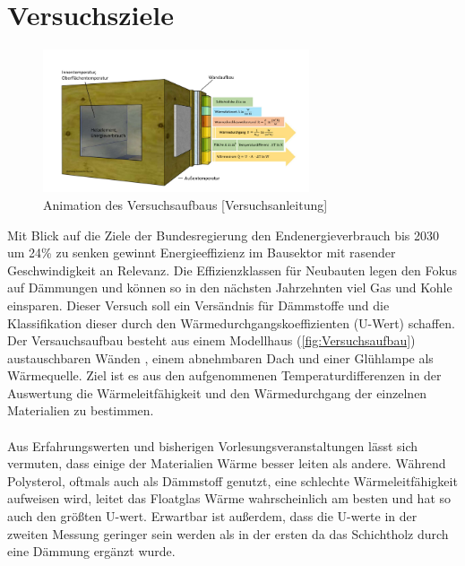 \section{Versuchsziele}
\begin{figure}[!h]
		\centering
		\includegraphics[width=0.7\textwidth]{Abbildungen/Thurow_Deckblatt}
		\caption{Animation des Versuchsaufbaus [Versuchsanleitung] }
		\label{fig:Versuchsaufbau}
\end{figure}

Mit Blick auf die Ziele der Bundesregierung den Endenergieverbrauch bis 2030 um 24\% zu senken gewinnt Energieeffizienz im Bausektor mit rasender Geschwindigkeit an Relevanz. Die Effizienzklassen für Neubauten legen den Fokus auf Dämmungen und können so in den nächsten Jahrzehnten viel Gas und Kohle einsparen. Dieser Versuch soll ein Versändnis für Dämmstoffe und die Klassifikation dieser durch den Wärmedurchgangskoeffizienten (U-Wert) schaffen.  Der Versauchsaufbau besteht aus einem Modellhaus (\autoref{fig:Versuchsaufbau}) austauschbaren Wänden , einem abnehmbaren Dach und einer Glühlampe als Wärmequelle. Ziel ist es aus den aufgenommenen Temperaturdifferenzen in der Auswertung die Wärmeleitfähigkeit und den Wärmedurchgang der einzelnen Materialien zu bestimmen.\\\\
Aus Erfahrungswerten und bisherigen Vorlesungsveranstaltungen lässt sich vermuten, dass einige der Materialien Wärme besser leiten als andere. Während Polysterol, oftmals auch als Dämmstoff genutzt, eine schlechte Wärmeleitfähigkeit aufweisen wird, leitet das Floatglas Wärme wahrscheinlich am besten und hat so auch den größten U-wert. Erwartbar ist außerdem, dass die U-werte in der zweiten Messung geringer sein werden als in der ersten da das Schichtholz durch eine Dämmung ergänzt wurde.